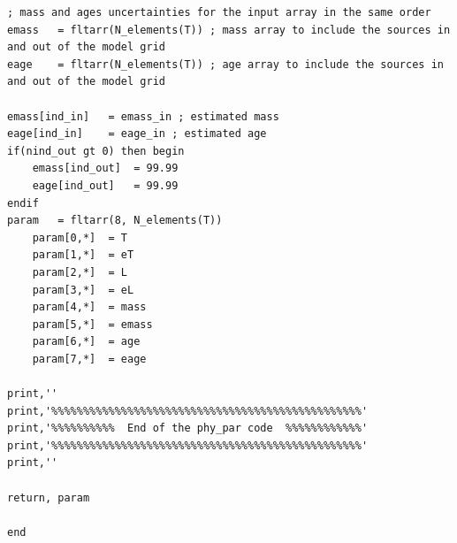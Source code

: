 \documentclass[12pt]{article}
\begin{document}
{\begin{Verbatim}[tabsize=4]
; mass and ages uncertainties for the input array in the same order
emass	= fltarr(N_elements(T)) ; mass array to include the sources in and out of the model grid
eage	= fltarr(N_elements(T)) ; age array to include the sources in and out of the model grid

emass[ind_in]	= emass_in ; estimated mass
eage[ind_in]	= eage_in ; estimated age
if(nind_out gt 0) then begin
	emass[ind_out]	= 99.99
	eage[ind_out]	= 99.99
endif
param	= fltarr(8, N_elements(T))
	param[0,*]	= T
	param[1,*]	= eT
	param[2,*]	= L
	param[3,*]	= eL
	param[4,*]	= mass
	param[5,*]	= emass
	param[6,*]	= age
	param[7,*]	= eage

print,''
print,'%%%%%%%%%%%%%%%%%%%%%%%%%%%%%%%%%%%%%%%%%%%%%%%%%'
print,'%%%%%%%%%%  End of the phy_par code  %%%%%%%%%%%%'
print,'%%%%%%%%%%%%%%%%%%%%%%%%%%%%%%%%%%%%%%%%%%%%%%%%%'
print,''

return, param

end
\end{Verbatim}
}

\small
\setlength{\bibsep}{0pt plus 0.4ex}
\end{document}
